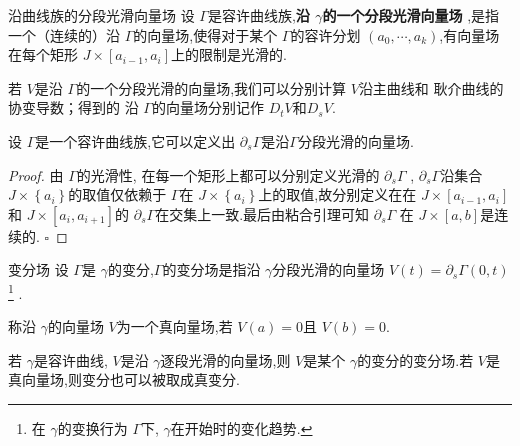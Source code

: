 \documentclass[../../几何与拓扑.tex]{subfiles}
\begin{document}
\begin{definition}{沿曲线族的分段光滑向量场}
    设 \(   \Gamma   \)是容许曲线族,\textbf{沿 \(   \gamma   \)的一个分段光滑向量场 },是指一个（连续的）沿 \(   \Gamma   \)的向量场,使得对于某个 \(   \Gamma   \)的容许分划 \(  \left(  a_0,\cdots,a_{k}    \right)   \),有向量场在每个矩形 \(  J\times \left[ a_{i-1},a_{i} \right]   \)上的限制是光滑的.
\end{definition}

\begin{remark}
    若 \(  V  \)是沿 \(   \Gamma   \)的一个分段光滑的向量场,我们可以分别计算 \(  V  \)沿主曲线和 耿介曲线的协变导数；得到的 沿 \(   \Gamma   \)的向量场分别记作 \(  D_{t}V  \)和\(  D_{s}V  \).   
\end{remark}

\begin{proposition}
    设 \(   \Gamma   \)是一个容许曲线族,它可以定义出 \(  \partial _{s} \Gamma   \)是沿\(   \Gamma   \)分段光滑的向量场.    
\end{proposition}
\begin{proof}
    由 \(   \Gamma   \)的光滑性, 在每一个矩形上都可以分别定义光滑的 \(  \partial _{s} \Gamma   \) , \(  \partial _{s} \Gamma   \)沿集合 \(  J\times \left\{ a_{i} \right\}  \)的取值仅依赖于 \(   \Gamma   \)在 \(  J\times \left\{ a_{i} \right\}  \)上的取值,故分别定义在在 \(  J\times \left[ a_{i-1},a_{i} \right]   \)和 \(  J\times \left[ a_{i},a_{i+ 1} \right]   \)的 \(  \partial _{s} \Gamma   \)在交集上一致.最后由粘合引理可知 \(  \partial _{s} \Gamma   \)    在 \(  J\times \left[ a,b \right]   \)是连续的. 
    \hfill $\square$
\end{proof}

\begin{definition}{变分场}
    设 \(   \Gamma   \)是 \(   \gamma   \)的变分,\(   \Gamma   \)的变分场是指沿 \(   \gamma   \)分段光滑的向量场 \(  V\left( t  \right)= \partial _{s} \Gamma \left( 0,t \right)    \)    \footnote{在 \(   \gamma   \)的变换行为 \(   \Gamma   \)下, \(   \gamma   \)在开始时的变化趋势.   } .
\end{definition}

\begin{definition}
    称沿 \(   \gamma   \)的向量场 \(  V  \)为一个真向量场,若 \(  V\left( a \right)= 0   \)且 \(  V\left( b \right)= 0   \).    
\end{definition}


\begin{lemma}
    若 \(   \gamma   \)是容许曲线, \(  V  \)是沿 \(   \gamma   \)逐段光滑的向量场,则 \(  V  \)是某个 \(   \gamma   \)的变分的变分场.若 \(  V  \)是真向量场,则变分也可以被取成真变分.      
\end{lemma}
\end{document}
